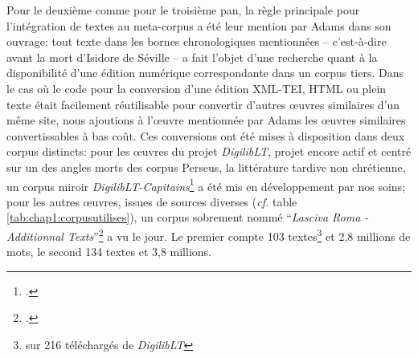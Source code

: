 Pour le deuxième comme pour le troisième pan, la règle principale pour l'intégration de textes au meta-corpus a été leur mention par Adams dans son ouvrage: tout texte dans les bornes chronologiques mentionnées -- c'est-à-dire avant la mort d'Isidore de Séville -- a fait l'objet d'une recherche quant à la disponibilité d'une édition numérique correspondante dans un corpus tiers. Dans le cas où le code pour la conversion d'une édition XML-TEI, HTML ou plein texte était facilement réutilisable pour convertir d'autres œuvres similaires d'un même site, nous ajoutions à l'œuvre mentionnée par Adams les œuvres similaires convertissables à bas coût. Ces conversions ont été mises à disposition dans deux corpus distincts: pour les œuvres du projet \textit{DigilibLT}, projet encore actif et centré sur un des angles morts des corpus Perseus, la littérature tardive non chrétienne, un corpus miroir \textit{DigilibLT-Capitains}\footcite{Clerice_Digital_Latin_Library_2021} a été mis en développement par nos soins; pour les autres œuvres, issues de sources diverses (\textit{cf.} table \ref{tab:chap1:corpusutilises}), un corpus sobrement nommé \enquote{\textit{Lasciva Roma - Additionnal Texts}}\footcite{Clerice_Corpora_of_rare_2021} a vu le jour. Le premier compte 103 textes\footnote{sur 216 téléchargés de \textit{DigilibLT}} et 2,8 millions de mots, le second 134 textes et 3,8 millions.


